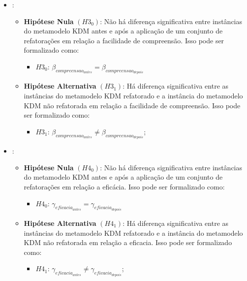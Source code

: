 \begin{itemize}
\item {}:

\begin{itemize}
\item \textbf{Hipótese Nula} \textbf{$(H3_{0})$}: Não há diferença significativa entre instâncias do metamodelo KDM antes e após a aplicação de um conjunto de refatorações em relação a facilidade de compreensão. Isso pode ser formalizado como: 

\begin{itemize}
\item $H3_{0}$: $\beta_{compreensao_{antes}} = \beta_{compreensao_{depois}}$
\end{itemize}

\item \textbf{Hipótese Alternativa} \textbf{$(H3_{1})$}: Há diferença significativa entre as instâncias do metamodelo KDM refatorado e a instância do metamodelo KDM não refatorada em relação a facilidade de compreensão. Isso pode ser formalizado como: 

\begin{itemize}
\item $H3_{1}$: $\beta_{compreensao_{antes}} \neq \beta_{compreensao_{depois}}$;
\end{itemize}
\end{itemize}

\item {}:
    
    \begin{itemize}
\item \textbf{Hipótese Nula} \textbf{$(H4_{0})$}: Não há diferença significativa entre instâncias do metamodelo KDM antes e após a aplicação de um conjunto de refatorações em relação a eficácia. Isso pode ser formalizado como: 

\begin{itemize}
\item $H4_{0}$: $\gamma_{eficacia_{antes}} = \gamma_{eficacia_{depois}}$
\end{itemize}

\item \textbf{Hipótese Alternativa} \textbf{$(H4_{1})$}: Há diferença significativa entre as instâncias do metamodelo KDM refatorado e a instância do metamodelo KDM não refatorada em relação a eficacia. Isso pode ser formalizado como: 

\begin{itemize}
\item $H4_{1}$: $\gamma_{eficacia_{antes}} \neq \gamma_{eficacia_{depois}}$;
\end{itemize}
\end{itemize}

\end{itemize}

